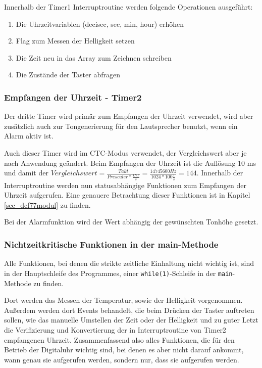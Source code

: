 Innerhalb der Timer1 Interruptroutine werden folgende Operationen ausgeführt:
\begin{enumerate}
  \item Die Uhrzeitvariablen (decisec, sec, min, hour) erhöhen
  \item Flag zum Messen der Helligkeit setzen
  \item Die Zeit neu in das Array zum Zeichnen schreiben
  \item Die Zustände der Taster abfragen
\end{enumerate}
 
\subsubsection{Empfangen der Uhrzeit - Timer2}
Der dritte Timer wird primär zum Empfangen der Uhrzeit verwendet, wird aber zusätzlich auch zur Tongenerierung für den Lautsprecher benutzt, wenn ein Alarm aktiv ist.

Auch dieser Timer wird im CTC-Modus verwendet, der Vergleichswert aber je nach Anwendung geändert. Beim Empfangen der Uhrzeit ist die Auflösung 10 ms und damit der $Vergleichswert = \frac{Takt}{Prescaler * \frac{INT}{s}} = \frac{14745600 Hz}{1024 * 100 \frac{1}{s}} = 144$. Innerhalb der Interruptroutine werden nun statusabhängige Funktionen zum Empfangen der Uhrzeit aufgerufen. Eine genauere Betrachtung dieser Funktionen ist in Kapitel \ref{sec_dcf77modul} zu finden.

Bei der Alarmfunktion wird der Wert abhängig der gewünschten Tonhöhe gesetzt.

\subsubsection{Nichtzeitkritische Funktionen in der main-Methode}
Alle Funktionen, bei denen die strikte zeitliche Einhaltung nicht wichtig ist, sind in der Hauptschleife des Programmes, einer \texttt{while(1)}-Schleife in der \texttt{main}-Methode zu finden.

Dort werden das Messen der Temperatur, sowie der Helligkeit vorgenommen. Außerdem werden dort Events behandelt, die beim Drücken der Taster auftreten sollen, wie das manuelle Umstellen der Zeit oder der Helligkeit und zu guter Letzt die Verifizierung und Konvertierung der in Interruptroutine von Timer2 empfangenen Uhrzeit. Zusammenfassend also alles Funktionen, die für den Betrieb der Digitaluhr wichtig sind, bei denen es aber nicht darauf ankommt, wann genau sie aufgerufen werden, sondern nur, dass sie aufgerufen werden. 

